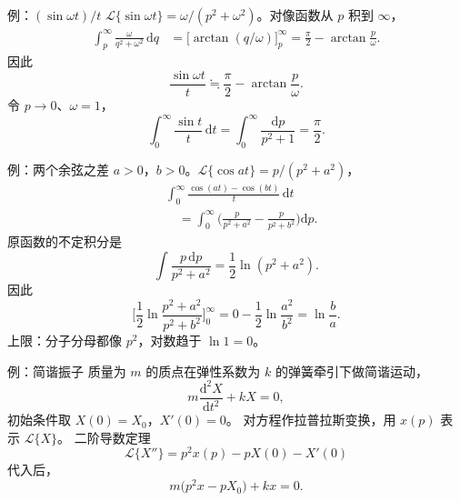 \documentclass[fontset=windows, chinese, 10pt, xcolor=dvipsnames]{beamer}
\begin{document}
\begin{frame}{例：$(\sin\omega t)/t$}
  $\mathcal{L}\{\sin\omega t\}=\omega/(p^2+\omega^2)$。对像函数从 $p$ 积到 $\infty$，
  \begin{align*}
    \int_p^{\infty}\frac{\omega}{q^2+\omega^2}\,\mathrm{d}q
    &=\bigl[\arctan(q/\omega)\bigr]_p^{\infty}
     =\frac{\pi}{2}-\arctan\frac{p}{\omega}.
  \end{align*}
  因此
  \begin{equation*}
    \frac{\sin\omega t}{t}
    \fallingdotseq\frac{\pi}{2}-\arctan\frac{p}{\omega}.
  \end{equation*}
  令 $p\to 0$、$\omega=1$，
  \begin{equation*}
    \int_0^{\infty}\frac{\sin t}{t}\,\mathrm{d}t
    =\int_0^{\infty}\frac{\mathrm{d}p}{p^2+1}
    =\frac{\pi}{2}.
  \end{equation*}
\end{frame}

\begin{frame}{例：两个余弦之差}
  $a>0$，$b>0$。$\mathcal{L}\{\cos at\}=p/(p^2+a^2)$，
  \begin{align*}
    &\int_0^{\infty}\frac{\cos(at)-\cos(bt)}{t}\,\mathrm{d}t \\
    &\quad=\int_0^{\infty}
      \Biggl(\frac{p}{p^2+a^2}-\frac{p}{p^2+b^2}\Biggr)\mathrm{d}p.
  \end{align*}
  原函数的不定积分是
  \begin{equation*}
    \int\frac{p\,\mathrm{d}p}{p^2+a^2}=\frac12\ln(p^2+a^2).
  \end{equation*}
  因此
  \begin{equation*}
    \Biggl[\frac12\ln\frac{p^2+a^2}{p^2+b^2}\Biggr]_0^{\infty}
    =0-\frac12\ln\frac{a^2}{b^2}
    =\ln\frac{b}{a}.
  \end{equation*}
  上限：分子分母都像 $p^2$，对数趋于 $\ln 1=0$。
\end{frame}

\begin{frame}{例：简谐振子}
  质量为 $m$ 的质点在弹性系数为 $k$ 的弹簧牵引下做简谐运动，
  \begin{equation*}
    m\frac{\mathrm{d}^2 X}{\mathrm{d}t^2}+k X=0,
  \end{equation*}
  初始条件取 $X(0)=X_0$，$X'(0)=0$。
  对方程作拉普拉斯变换，用 $x(p)$ 表示 $\mathcal{L}\{X\}$。
  二阶导数定理
  \begin{equation*}
    \mathcal{L}\{X''\}=p^2 x(p)-p X(0)-X'(0)
  \end{equation*}
  代入后，
  \begin{equation*}
    m\bigl(p^2 x-p X_0\bigr)+k x=0.
  \end{equation*}
\end{frame}
\end{document}
